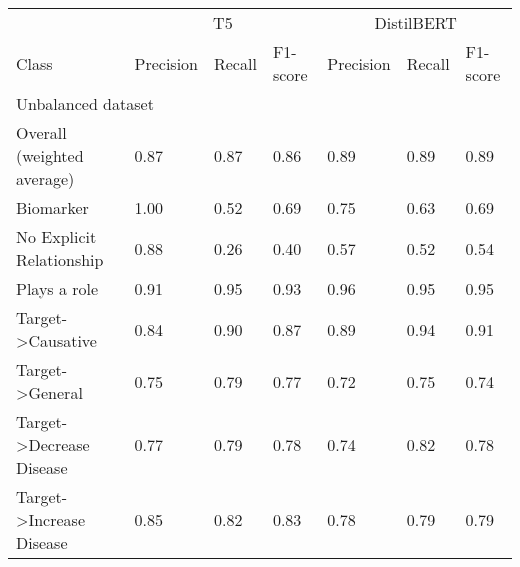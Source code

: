 \documentclass[final,12pt,3p,times,twocolumn,authoryear]{elsarticle}
\begin{document}
\begin{table*}[!t]
    \centering
    \begin{tabular}{|l|l|l|l|l|l|l|}
    \hline
    	& \multicolumn{3}{|c|}{T5} & \multicolumn{3}{c|}{DistilBERT} \\
        Class & Precision & Recall & F1-score & Precision & Recall & F1-score \\ \hline
        \multicolumn{7}{|l|}{Unbalanced dataset}   \\  \hline
         Overall (weighted average) &   0.87 &  0.87  &  0.86 & 0.89 & 0.89 & 0.89 \\
        
        \hspace*{3mm} Biomarker & 1.00 &   0.52 &  0.69 & 0.75 & 0.63 & 0.69\\
        \hspace*{3mm} No Explicit Relationship   &  0.88  &  0.26  & 0.40 & 0.57 & 0.52 & 0.54 \\
        \hspace*{3mm} Plays a role &   0.91   &   0.95  &  0.93 & 0.96 & 0.95 & 0.95 \\
        \hspace*{3mm} Target-\textgreater Causative  & 0.84 & 0.90 &  0.87  & 0.89 & 0.94 & 0.91\\
        \hspace*{3mm} Target-\textgreater General        &  0.75 & 0.79 & 0.77 & 0.72 & 0.75 & 0.74\\
        \hspace*{3mm} Target-\textgreater Decrease Disease & 0.77 &   0.79 &  0.78  & 0.74 & 0.82 & 0.78\\
        \hspace*{3mm} Target-\textgreater Increase Disease   &  0.85   &   0.82   &   0.83 & 0.78 & 0.79 & 0.79\\
        \hline
        

\end{tabular}
\end{table*}
\end{document}
